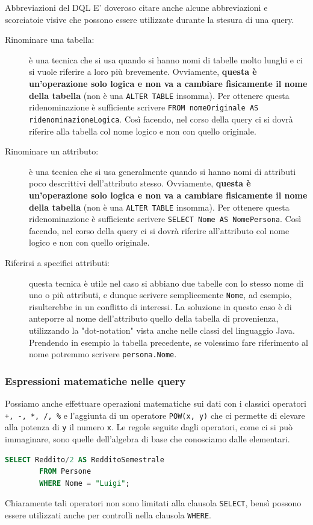 \documentclass[12pt]{report}
\begin{document}
	\begin{osservazione}{Abbreviazioni del DQL}{}
		E' doveroso citare anche alcune abbreviazioni e scorciatoie visive che possono essere utilizzate durante la stesura di una query.
		\begin{description}
			\item[Rinominare una tabella:] è una tecnica che si usa quando si hanno nomi di tabelle molto lunghi e ci si vuole riferire a loro più brevemente. Ovviamente, \textbf{questa è un'operazione solo logica e non va a cambiare fisicamente il nome della tabella} (non è una \texttt{ALTER TABLE} insomma). Per ottenere questa ridenominazione è sufficiente scrivere \texttt{FROM nomeOriginale AS ridenominazioneLogica}. Così facendo, nel corso della query ci si dovrà riferire alla tabella col nome logico e non con quello originale.
			
			\item[Rinominare un attributo:] è una tecnica che si usa generalmente quando si hanno nomi di attributi poco descrittivi dell'attributo stesso. Ovviamente, \textbf{questa è un'operazione solo logica e non va a cambiare fisicamente il nome della tabella} (non è una \texttt{ALTER TABLE} insomma). Per ottenere questa ridenominazione è sufficiente scrivere \texttt{SELECT Nome AS NomePersona}. Così facendo, nel corso della query ci si dovrà riferire all'attributo col nome logico e non con quello originale.
			
			\item[Riferirsi a specifici attributi:] questa tecnica è utile nel caso si abbiano due tabelle con lo stesso nome di uno o più attributi, e dunque scrivere semplicemente \texttt{Nome}, ad esempio, risulterebbe in un conflitto di interessi. La soluzione in questo caso è di anteporre al nome dell'attributo quello della tabella di provenienza, utilizzando la "dot-notation" vista anche nelle classi del linguaggio Java. Prendendo in esempio la tabella precedente, se volessimo fare riferimento al nome potremmo scrivere \texttt{persona.Nome}.
		\end{description}
	\end{osservazione}
	
	\subsubsection*{Espressioni matematiche nelle query}
	Possiamo anche effettuare operazioni matematiche sui dati con i classici operatori \texttt{+, -, *, /, \%} e l'aggiunta di un operatore \texttt{POW(x, y)} che ci permette di elevare alla potenza di \texttt{y} il numero \texttt{x}. Le regole seguite dagli operatori, come ci si può immaginare, sono quelle dell'algebra di base che conosciamo dalle elementari.
	\begin{lstlisting}[language=SQL, caption={Esempio di query con operazioni matematiche nella \texttt{SELECT}}]
		SELECT Reddito/2 AS RedditoSemestrale
		FROM Persone
		WHERE Nome = "Luigi";
	\end{lstlisting}
	Chiaramente tali operatori non sono limitati alla clausola \texttt{SELECT}, bensì possono essere utilizzati anche per controlli nella clausola \texttt{WHERE}.
	
\end{document}
